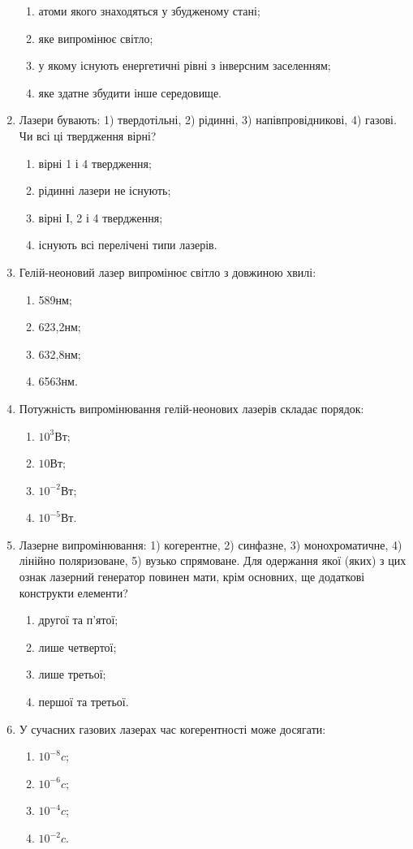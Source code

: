 \documentclass[twocolumn]{el-author}
\begin{document}
\begin{enumerate}
\begin{enumerate}
		\item атоми якого знаходяться у збудженому стані;
		\item яке випромінює світло;
		\item у якому існують енергетичні рівні з інверсним заселенням;
		\item яке здатне збудити інше середовище.
	\end{enumerate}
	\item Лазери бувають: 1) твердотільні, 2) рідинні, 3) напівпровідникові, 4) газові.
Чи всі ці твердження вірні?
	\begin{enumerate}
		\item вірні 1 і 4 твердження;
		\item рідинні лазери не існують;
		\item вірні І, 2 і 4 твердження;
		\item існують всі перелічені типи лазерів.
	\end{enumerate}
	\item Гелій-неоновий лазер випромінює світло з довжиною хвилі:
	\begin{enumerate}
		\item 589нм;
		\item 623,2нм;
		\item 632,8нм;
		\item 6563нм.
	\end{enumerate}
	\item Потужність випромінювання гелій-неонових лазерів складає порядок:
	\begin{enumerate}
		\item $10^{3}Вт$;
		\item $10Вт$;
		\item $10^{-2}Вт$;
		\item $10^{-5}Вт$.
	\end{enumerate}
	\item Лазерне випромінювання: 1) когерентне, 2) синфазне, 3) монохроматичне,
4) лінійно поляризоване, 5) вузько спрямоване. Для одержання якої (яких)
з цих ознак лазерний генератор повинен мати, крім основних, ще додаткові
конструкти елементи?
	\begin{enumerate}
		\item другої та п'ятої;
		\item лише четвертої;
		\item лише третьої;
		\item першої та третьої.
	\end{enumerate}
	\item У сучасних газових лазерах час когерентності може досягати:
	\begin{enumerate}
		\item $10^{-8}c$;
		\item $10^{-6}c$;
		\item $10^{-4}c$;
		\item $10^{-2}c$.
	\end{enumerate}
\end{enumerate}
\end{document}
